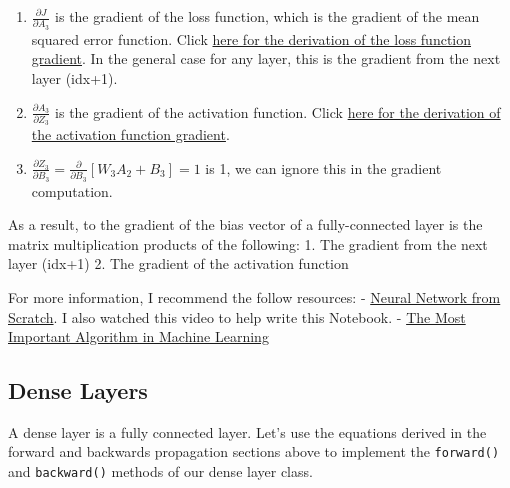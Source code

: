 \documentclass[11pt]{article}
\begin{document}
\begin{enumerate}
\def\labelenumi{\arabic{enumi}.}
\item
  \(\frac{\partial J}{\partial A_3}\) is the gradient of the loss
  function, which is the gradient of the mean squared error function.
  Click
  \hyperref[mean-squared-error-gradient]{here for the derivation of the loss function gradient}.
  In the general case for any layer, this is the gradient from the next
  layer (idx+1).
\item
  \(\frac{\partial A_3}{\partial Z_3}\) is the gradient of the
  activation function. Click
  \hyperref[tanh-activation-function-gradient]{here for the derivation of the activation function gradient}.
\item
  \(\frac{\partial Z_3}{\partial B_3} = \frac{\partial}{\partial B_3}[W_3 A_2 + B_3] = 1\)
  is 1, we can ignore this in the gradient computation.
\end{enumerate}

As a result, to the gradient of the bias vector of a fully-connected
layer is the matrix multiplication products of the following: 1. The
gradient from the next layer (idx+1) 2. The gradient of the activation
function

    For more information, I recommend the follow resources: -
\href{https://www.youtube.com/watch?v=pauPCy_s0Ok}{Neural Network from
Scratch}. I also watched this video to help write this Notebook. -
\href{https://www.youtube.com/watch?v=SmZmBKc7Lrs}{The Most Important
Algorithm in Machine Learning}

    \subsection{Dense Layers}\label{dense-layers}

A dense layer is a fully connected layer. Let's use the equations
derived in the forward and backwards propagation sections above to
implement the \texttt{forward()} and \texttt{backward()} methods of our
dense layer class.
\end{document}
